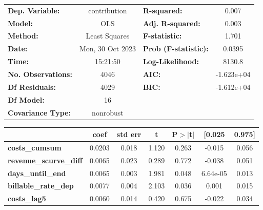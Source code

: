 \begin{center}
\begin{tabular}{lclc}
\toprule
\textbf{Dep. Variable:}                &   contribution   & \textbf{  R-squared:         } &     0.007   \\
\textbf{Model:}                        &       OLS        & \textbf{  Adj. R-squared:    } &     0.003   \\
\textbf{Method:}                       &  Least Squares   & \textbf{  F-statistic:       } &     1.701   \\
\textbf{Date:}                         & Mon, 30 Oct 2023 & \textbf{  Prob (F-statistic):} &   0.0395    \\
\textbf{Time:}                         &     15:21:50     & \textbf{  Log-Likelihood:    } &    8130.8   \\
\textbf{No. Observations:}             &        4046      & \textbf{  AIC:               } & -1.623e+04  \\
\textbf{Df Residuals:}                 &        4029      & \textbf{  BIC:               } & -1.612e+04  \\
\textbf{Df Model:}                     &          16      & \textbf{                     } &             \\
\textbf{Covariance Type:}              &    nonrobust     & \textbf{                     } &             \\
\bottomrule
\end{tabular}
\begin{tabular}{lcccccc}
                                       & \textbf{coef} & \textbf{std err} & \textbf{t} & \textbf{P$> |$t$|$} & \textbf{[0.025} & \textbf{0.975]}  \\
\midrule
\textbf{costs\_cumsum}                 &       0.0203  &        0.018     &     1.120  &         0.263        &       -0.015    &        0.056     \\
\textbf{revenue\_scurve\_diff}         &       0.0065  &        0.023     &     0.289  &         0.772        &       -0.038    &        0.051     \\
\textbf{days\_until\_end}              &       0.0065  &        0.003     &     1.981  &         0.048        &     6.64e-05    &        0.013     \\
\textbf{billable\_rate\_dep}           &       0.0077  &        0.004     &     2.103  &         0.036        &        0.001    &        0.015     \\
\textbf{costs\_lag5}                   &       0.0060  &        0.014     &     0.420  &         0.675        &       -0.022    &        0.034     \\

\end{tabular}
\end{center}
